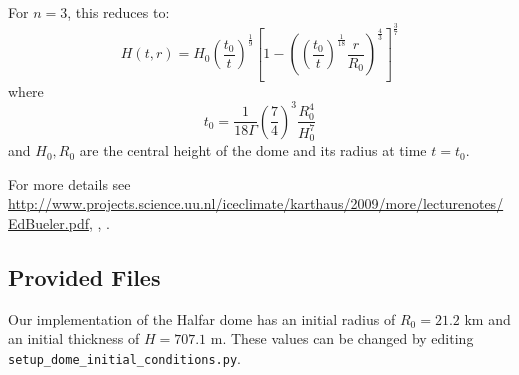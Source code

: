 For $n=3$, this reduces to:
\begin{equation}
    H(t,r) = H_0 \left(\frac{t_0}{t}\right)^\frac{1}{9}  \left[ 1 - \left(  \left( \frac{t_0}{t} \right) ^ \frac{1}{18} \frac{r}{R_0} \right)^\frac{4}{3} \right] ^ \frac{3}{7}
\end{equation}
where
\begin{equation}
    t_0 = \frac{1}{18\Gamma} \left( \frac{7}{4} \right)^3 \frac{R_0^4}{H_0^7}
\end{equation}
and $H_0, R_0$ are the central height of the dome and its radius at time $t=t_0$.

For more details see \url{http://www.projects.science.uu.nl/iceclimate/karthaus/2009/more/lecturenotes/EdBueler.pdf},  \citet{bueler2005}, \citet{Halfar1983}.



\subsection{Provided Files}
\label{subsec:halfar_files}
Our implementation of the Halfar dome has an initial radius of $R_0=21.2$ km and an initial thickness of $H=707.1$ m.
These values can be changed by editing \texttt{setup\_dome\_initial\_conditions.py}.

